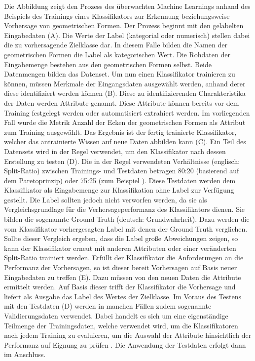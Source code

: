 Die Abbildung zeigt den Prozess des überwachten Machine Learnings anhand des Beispiels des Trainings eines Klassifikators zur Erkennung beziehungsweise Vorhersage von geometrischen Formen. Der Prozess beginnt mit den \glqq gelabelten\grqq{} Eingabedaten (A). Die Werte der Label (kategorial oder numerisch) stellen dabei die zu vorhersagende Zielklasse dar. In diesem Falle bilden die Namen der geometrischen Formen die Label als kategorischen Wert. Die Rohdaten der Eingabemenge bestehen aus den geometrischen Formen selbst. Beide Datenmengen bilden das Datenset. Um nun einen Klassifikator trainieren zu können, müssen Merkmale der Eingangsdaten ausgewählt werden, anhand derer diese identifiziert werden können (B). Diese zu identifizierenden Charakteristika der Daten werden Attribute genannt. Diese Attribute können bereits vor dem Training festgelegt werden oder automatisiert extrahiert werden. Im vorliegenden Fall wurde die Metrik \glqq Anzahl der Ecken der geometrischen Formen\grqq{} als Attribut zum Training ausgewählt. Das Ergebnis ist der fertig trainierte Klassifikator, welcher das antrainierte Wissen auf neue Daten abbilden kann (C). Ein Teil des Datensets wird in der Regel verwendet, um den Klassifikator nach dessen Erstellung zu testen (D). Die in der Regel verwendeten Verhältnisse (englisch: Split-Ratio) zwischen Trainings- und Testdaten betragen 80:20 (basierend auf dem Paretoprinzip) oder 75:25 (zum Beispiel \cite{Queiroz2016}). Diese Testdaten werden dem Klassifikator als Eingabemenge zur Klassifikation ohne Label zur Verfügung gestellt. Die Label sollten jedoch nicht verworfen werden, da sie als Vergleichsgrundlage für die Verhersageperformanz des Klassifikators dienen. Sie bilden die sogenannte \glqq Ground Truth\grqq{} (deutsch: Grundwahrheit). Dazu werden die vom Klassifikator vorhergesagten Label mit denen der Ground Truth verglichen. Sollte dieser Vergleich ergeben, dass die Label große Abweichungen zeigen, so kann der Klassifikator erneut mit anderen Attributen oder einer veränderten Split-Ratio trainiert werden. Erfüllt der Klassifikator die Anforderungen an die Performanz der Vorhersagen, so ist dieser bereit Vorhersagen auf Basis neuer Eingabedaten zu treffen (E). Dazu müssen von den neuen Daten die Attribute ermittelt werden. Auf Basis dieser trifft der Klassifikator die Vorhersage und liefert als Ausgabe das Label des Wertes der Zielklasse. Im Voraus des Testens mit den Testdaten (D) werden in manchen Fällen zudem sogenannte Validierungsdaten verwendet. Dabei handelt es sich um eine eigenständige Teilmenge der Trainingsdaten, welche verwendet wird, um die Klassifikatoren nach jedem Training zu evaluieren, um die Auswahl der Attribute hinsichtlich der Performanz auf Eignung zu prüfen \cite{Sammut2017}. Die Anwendung der Testdaten erfolgt dann im Anschluss.

